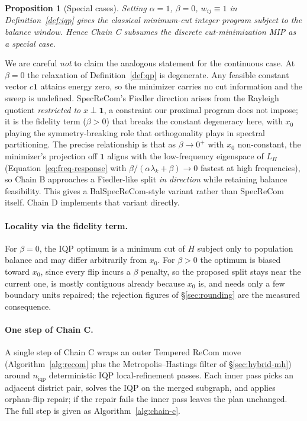 \documentclass[11pt]{article}
\newtheorem{proposition}{Proposition}[section]
\begin{document}
\begin{proposition}[Special cases]\label{prop:iqp-special-cases}
Setting $\alpha = 1$, $\beta = 0$, $w_{ij} \equiv 1$ in
Definition~\ref{def:iqp} gives the classical minimum-cut integer
program subject to the balance window. Hence Chain C subsumes
the discrete cut-minimization MIP as a special case.
\end{proposition}

We are careful \emph{not} to claim the analogous statement for the
continuous case. At $\beta = 0$ the relaxation of
Definition~\ref{def:qp} is degenerate. Any feasible constant vector
$c\mathbf{1}$ attains energy zero, so the minimizer carries no cut
information and the sweep is undefined. SpecReCom's Fiedler direction
arises from the Rayleigh quotient \emph{restricted to}
$x \perp \mathbf{1}$, a constraint our proximal program does not
impose; it is the fidelity term ($\beta > 0$) that breaks the constant
degeneracy here, with $x_0$ playing the symmetry-breaking role that
orthogonality plays in spectral partitioning. The precise relationship
is that as $\beta \to 0^+$ with $x_0$ non-constant, the minimizer's
projection off $\mathbf{1}$ aligns with the low-frequency eigenspace
of $L_H$ (Equation~\eqref{eq:freq-response} with
$\beta/(\alpha\lambda_k + \beta) \to 0$ fastest at high frequencies),
so Chain B approaches a Fiedler-like split \emph{in direction} while
retaining balance feasibility. This gives a BalSpecReCom-style variant rather
than SpecReCom itself. Chain D implements that variant directly.

\paragraph{Locality via the fidelity term.}\label{sec:iqp-locality}

For $\beta = 0$, the IQP optimum is a minimum cut of $H$ subject only
to population balance and may differ arbitrarily from $x_0$. For
$\beta > 0$ the optimum is biased toward $x_0$, since every flip
incurs a $\beta$ penalty, so the proposed split stays near the current
one, is mostly contiguous already because $x_0$ is, and needs only a
few boundary units repaired; the rejection figures of
\S\ref{sec:rounding} are the measured consequence.

\paragraph{One step of Chain C.}\label{sec:chain-c-step}
A single step of Chain C wraps an outer Tempered ReCom move
(Algorithm~\ref{alg:recom} plus the Metropolis--Hastings filter of
\S\ref{sec:hybrid-mh}) around $n_{\mathrm{iqp}}$ deterministic
IQP local-refinement passes. Each inner pass picks an adjacent district
pair, solves the IQP on the merged subgraph, and applies orphan-flip
repair; if the repair fails the inner pass leaves the plan unchanged.
The full step is given as Algorithm~\ref{alg:chain-c}.
\end{document}
